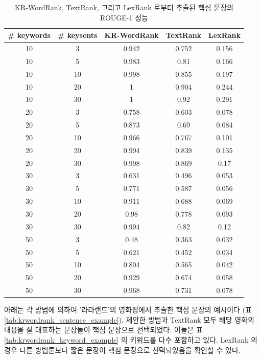 \documentclass[oneside, ko,phd]{snuthesis_utf8_kor}
\begin{document}
\begin{table}[H]
\centering
\small
\caption{KR-WordRank, TextRank, 그리고 LexRank 로부터 추출된 핵심 문장의 ROUGE-1 성능}
\label{tab:krwordrank_sentence_performance}
\begin{tabular}{|c|c|c|c|c|}
\hline
\textbf{\# keywords} & \textbf{\# keysents} & \textbf{KR-WordRank} & \textbf{TextRank} & \textbf{LexRank} \\ \hline
10 & 3 & 0.942 & 0.752 & 0.156 \\ \hline
10 & 5 & 0.983 & 0.81 & 0.166 \\ \hline
10 & 10 & 0.998 & 0.855 & 0.197 \\ \hline
10 & 20 & 1 & 0.904 & 0.244 \\ \hline
10 & 30 & 1 & 0.92 & 0.291 \\ \hline
20 & 3 & 0.758 & 0.603 & 0.078 \\ \hline
20 & 5 & 0.873 & 0.69 & 0.084 \\ \hline
20 & 10 & 0.966 & 0.767 & 0.101 \\ \hline
20 & 20 & 0.994 & 0.839 & 0.135 \\ \hline
20 & 30 & 0.998 & 0.869 & 0.17 \\ \hline
30 & 3 & 0.631 & 0.496 & 0.053 \\ \hline
30 & 5 & 0.771 & 0.587 & 0.056 \\ \hline
30 & 10 & 0.911 & 0.688 & 0.069 \\ \hline
30 & 20 & 0.98 & 0.778 & 0.093 \\ \hline
30 & 30 & 0.994 & 0.82 & 0.12 \\ \hline
50 & 3 & 0.48 & 0.363 & 0.032 \\ \hline
50 & 5 & 0.621 & 0.452 & 0.034 \\ \hline
50 & 10 & 0.804 & 0.565 & 0.042 \\ \hline
50 & 20 & 0.929 & 0.674 & 0.058 \\ \hline
50 & 30 & 0.968 & 0.731 & 0.078 \\ \hline
\end{tabular}
\end{table}

아래는 각 방법에 의하여 '라라랜드'의 영화평에서 추출한 핵심 문장의 예시이다 (표 \ref{tab:krwordrank_sentence_example}).
제안한 방법과 TextRank 모두 해당 영화의 내용을 잘 대표하는 문장들이 핵심 문장으로 선택되었다.
이들은 표 \ref{tab:krwordrank_keyword_example} 의 키워드를 다수 포함하고 있다.
LexRank 의 경우 다른 방법론보다 짧은 문장이 핵심 문장으로 선택되었음을 확인할 수 있다.
\end{document}
